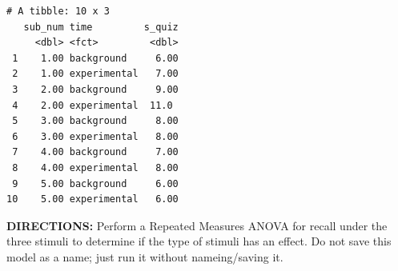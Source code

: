 \documentclass[]{article}
\newenvironment{Shaded}{\begin{snugshade}}{\end{snugshade}}
\newcommand{\KeywordTok}[1]{\textcolor[rgb]{0.13,0.29,0.53}{\textbf{#1}}}
\newcommand{\DataTypeTok}[1]{\textcolor[rgb]{0.13,0.29,0.53}{#1}}
\newcommand{\DecValTok}[1]{\textcolor[rgb]{0.00,0.00,0.81}{#1}}
\newcommand{\StringTok}[1]{\textcolor[rgb]{0.31,0.60,0.02}{#1}}
\newcommand{\OperatorTok}[1]{\textcolor[rgb]{0.81,0.36,0.00}{\textbf{#1}}}
\newcommand{\NormalTok}[1]{#1}
\begin{document}
\begin{Shaded}
\end{Shaded}

\begin{Shaded}
\end{Shaded}

\begin{verbatim}
# A tibble: 10 x 3
   sub_num time         s_quiz
     <dbl> <fct>         <dbl>
 1    1.00 background     6.00
 2    1.00 experimental   7.00
 3    2.00 background     9.00
 4    2.00 experimental  11.0 
 5    3.00 background     8.00
 6    3.00 experimental   8.00
 7    4.00 background     7.00
 8    4.00 experimental   8.00
 9    5.00 background     6.00
10    5.00 experimental   6.00
\end{verbatim}

\clearpage

\textbf{DIRECTIONS:} Perform a Repeated Measures ANOVA for recall under
the three stimuli to determine if the type of stimuli has an effect. Do
not save this model as a name; just run it without nameing/saving it.
\end{document}
